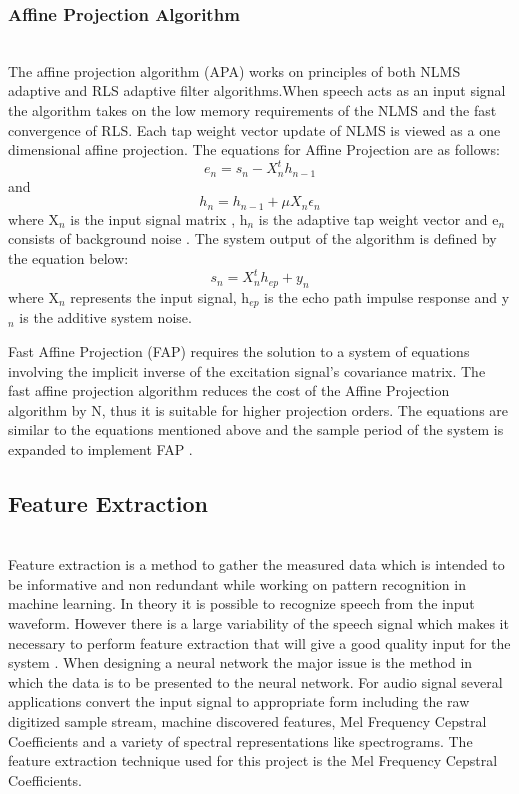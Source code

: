\documentclass[10pt,twocolumn]{witseiepaper}
\begin{document}
\subsubsection{Affine Projection Algorithm}\label{sec:affine} \hfill\\
The affine projection algorithm (APA) works on principles of both NLMS adaptive and RLS adaptive filter algorithms.When speech acts as an input signal the algorithm takes on the low memory requirements of the NLMS and the fast convergence of RLS. Each tap weight
vector update of NLMS is viewed as a one dimensional affine projection.
The equations for Affine Projection are as follows:
\begin{equation}\label{my_first_eqn}
e_n=s_n-X_n^th_{n-1}
\end{equation}
and
\begin{equation}\label{my_first_eqn}
h_n=h_{n-1}+\mu X_n\epsilon_n
\end{equation}
where X$_n$ is the input signal matrix , h$_n$ is the adaptive tap weight vector and e$_n$ consists of background noise \cite{FAP}.
The system output of the algorithm is defined by the equation below:
\begin{equation}\label{my_first_eqn}
s_n=X_n^th_{ep}+y_n
\end{equation}
where X$_n$ represents the input signal, h$_{ep}$  is the echo path impulse response and y$_n$ is the additive system noise.

Fast Affine Projection (FAP) requires the solution to a system of equations involving the implicit inverse of the excitation signal’s covariance matrix. The fast affine projection algorithm reduces the cost of the Affine Projection algorithm by N, thus it is suitable for higher projection orders. The equations are similar to the equations mentioned above and the sample period of the system is expanded to implement FAP \cite{FAP}.

\subsection{Feature Extraction}  \hfill\\
Feature extraction is a method to gather the measured data which is intended to be informative and non redundant while working on pattern recognition in machine learning. 
In theory it is possible to recognize speech from the input waveform. However there is a large variability of the speech signal which makes it necessary to perform feature extraction that will give a good quality input for the system \cite{MFCC-1}.
When designing a neural network the major issue is the method in which the data is to be presented to the neural network. For audio signal several applications convert the input signal to appropriate form including the raw digitized sample stream, machine discovered features, Mel Frequency Cepstral Coefficients and a variety of spectral representations like spectrograms.\cite{MFCC-2}
The feature extraction technique used for this project is the Mel Frequency Cepstral Coefficients.
\end{document}
